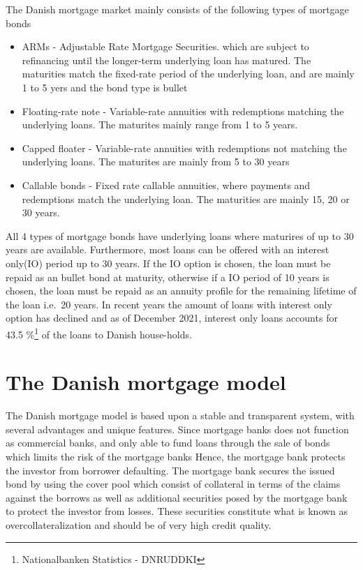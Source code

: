 \documentclass[12pt,twoside]{reedthesis}
\begin{document}
The Danish mortgage market mainly consists of the following types of mortgage bonds
\begin{itemize}
\item
  ARMs - Adjustable Rate Mortgage Securities. which are subject to refinancing until the longer-term underlying loan has matured. The maturities match the fixed-rate period of the underlying loan, and are mainly 1 to 5 yers and the bond type is bullet
\item
  Floating-rate note - Variable-rate annuities with redemptions matching the underlying loans. The maturites mainly range from 1 to 5 years.
\item
  Capped floater - Variable-rate annuities with redemptions not matching the underlying loans. The maturites are mainly from 5 to 30 years
\item
  Callable bonds - Fixed rate callable annuities, where payments and redemptions match the underlying loan. The maturities are mainly 15, 20 or 30 years.
\end{itemize}
All 4 types of mortgage bonds have underlying loans where maturires of up to 30 years are available. Furthermore, most loans can be offered with an interest only(IO) period up to 30 years. If the IO option is chosen, the loan must be repaid as an bullet bond at maturity, otherwise if a IO period of 10 years is chosen, the loan must be repaid as an annuity profile for the remaining lifetime of the loan i.e.~20 years. In recent years the amount of loans with interest only option has declined and as of December 2021, interest only loans accounts for 43.5 \%\footnote{Nationalbanken Statistics - DNRUDDKI} of the loans to Danish house-holds.

\hypertarget{the-danish-mortgage-model}{%
\section{The Danish mortgage model}\label{the-danish-mortgage-model}}

The Danish mortgage model is based upon a stable and transparent system, with several advantages and unique features. Since mortgage banks does not function as commercial banks, and only able to fund loans through the sale of bonds which limits the risk of the mortgage banks Hence, the mortgage bank protects the investor from borrower defaulting. The mortgage bank secures the issued bond by using the cover pool which consist of collateral in terms of the claims against the borrows as well as additional securities posed by the mortgage bank to protect the investor from losses. These securities constitute what is known as overcollateralization and should be of very high credit quality.
\end{document}
